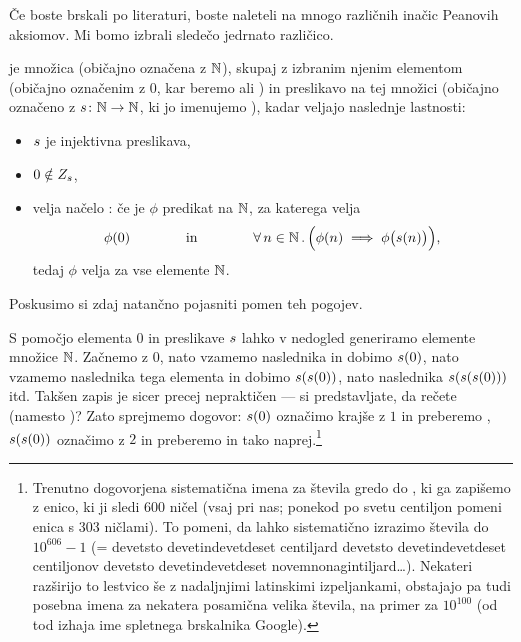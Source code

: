 Če boste brskali po literaturi, boste naleteli na mnogo različnih inačic Peanovih aksiomov. Mi bomo izbrali sledečo jedrnato različico.

\begin{definicija}[Peano]\label{definicija:naravna-stevila}
 je množica (običajno označena z $\mathbb{N}$), skupaj z izbranim njenim elementom (običajno označenim z $0$, kar beremo  ali ) in preslikavo na tej množici (običajno označeno z $\suc\colon \NN \to \NN$, ki jo imenujemo ), kadar veljajo naslednje lastnosti:
\begin{itemize}
\item
$\suc$ je injektivna preslikava,
\item
$0 \notin \rn{\suc}$,
\item
velja načelo : če je $\phi$ predikat na $\mathbb{N}$, za katerega velja
\[\phi(0) \qquad\qquad \text{in} \qquad\qquad \all[2]{n}[\NN]{\phi(n) \implies \phi\big(\suc[n]\big)},\]
tedaj $\phi$ velja za vse elemente $\mathbb{N}$.
\end{itemize}
\end{definicija}

Poskusimo si zdaj natančno pojasniti pomen teh pogojev.

S pomočjo elementa $0$ in preslikave $\suc$ lahko v nedogled generiramo elemente množice $\mathbb{N}$. Začnemo z $0$, nato vzamemo naslednika in dobimo $\suc[0]$, nato vzamemo naslednika tega elementa in dobimo $\suc(\suc[0])$, nato naslednika $\suc(\suc(\suc[0]))$ itd. Takšen zapis je sicer precej nepraktičen --- si predstavljate, da rečete  (namesto )? Zato sprejmemo dogovor: $\suc[0]$ označimo krajše z $1$ in preberemo , $\suc(\suc[0])$ označimo z $2$ in preberemo  in tako naprej.\footnote{Trenutno dogovorjena sistematična imena za števila gredo do , ki ga zapišemo z enico, ki ji sledi 600 ničel (vsaj pri nas; ponekod po svetu centiljon pomeni enica s 303 ničlami). To pomeni, da lahko sistematično izrazimo števila do $10^{606}-1$ (= devetsto devetindevetdeset centiljard devetsto devetindevetdeset centiljonov devetsto devetindevetdeset novemnonagintiljard\ldots). Nekateri razširijo to lestvico še z nadaljnjimi latinskimi izpeljankami, obstajajo pa tudi posebna imena za nekatera posamična velika števila, na primer  za $10^{100}$ (od tod izhaja ime spletnega brskalnika Google).}

